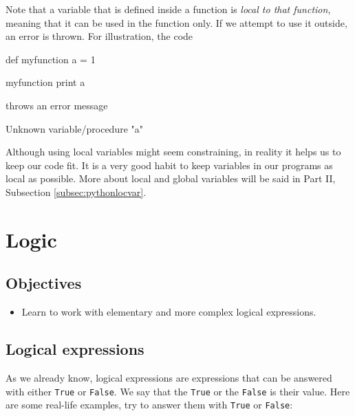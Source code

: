 Note that a variable that is defined inside a function is {\em local to that function}, 
meaning that it can be used in the function only. If we attempt to use it 
outside, an error is thrown. For illustration, the code 

\begin{bluecode}
def myfunction
  a = 1

myfunction
print a  
\end{bluecode}
throws an error message 

\begin{bluecode}
Unknown variable/procedure "a" 
\end{bluecode}
Although using local variables might seem constraining, in reality it helps us 
to keep our code fit. It is a very good habit to keep variables in our programs 
as local as possible. More about local and global variables will be said in 
Part II, Subsection \ref{subsec:pythonlocvar}.


\section{Logic} \label{sec:logic}

\subsection{Objectives} 
 
\begin{itemize}
\item Learn to work with elementary and more complex logical expressions.
\end{itemize}

\subsection{Logical expressions}
As we already know, logical expressions are expressions that can be answered with either {\tt True} or 
{\tt False}. We say that the {\tt True} or the {\tt False} is their value. Here are some 
real-life examples, try to answer them with {\tt True} or {\tt False}:

